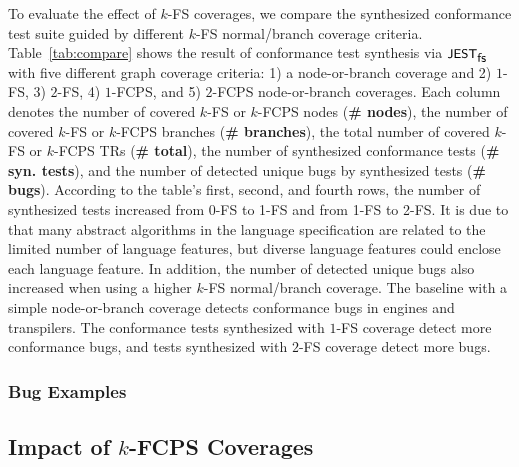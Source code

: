 To evaluate the effect of $k$-FS coverages, we compare the synthesized
conformance test suite guided by different $k$-FS normal/branch coverage
criteria.
%
Table~\ref{tab:compare} shows the result of conformance test synthesis via
$\textsf{\small JEST}_{\textsf{\small fs}}$ with five different graph coverage criteria: 1) a node-or-branch
coverage and 2) $1$-FS, 3) $2$-FS, 4) $1$-FCPS, and 5) $2$-FCPS node-or-branch
coverages.
%
Each column denotes the number of covered $k$-FS or $k$-FCPS nodes (\textbf{\#
nodes}), the number of covered $k$-FS or $k$-FCPS branches (\textbf{\#
branches}), the total number of covered $k$-FS or $k$-FCPS TRs (\textbf{\#
total}), the number of synthesized conformance tests (\textbf{\# syn. tests}),
and the number of detected unique bugs by synthesized tests (\textbf{\# bugs}).
%
According to the table's first, second, and fourth rows, the number of
synthesized tests increased  from 0-FS to 1-FS and
 from 1-FS to 2-FS.
%
It is due to that many abstract algorithms in the language specification are
related to the limited number of language features, but diverse language
features could enclose each language feature.
%
In addition, the number of detected unique bugs also increased when using a
higher $k$-FS normal/branch coverage.
%
The baseline with a simple node-or-branch coverage detects 
conformance bugs in engines and transpilers.
%
The conformance tests synthesized with $1$-FS coverage detect  more conformance bugs, and tests synthesized with $2$-FS coverage detect
 more bugs.


\subsubsection{Bug Examples}\label{sec:k-fs-example}

\todo


\subsection{Impact of $k$-FCPS Coverages}\label{sec:impact-k-fcps}


